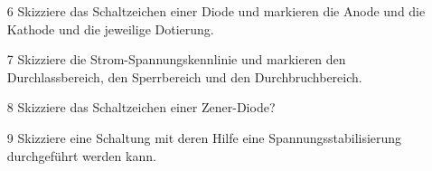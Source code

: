 \begin{enumerate}
\itemsep1pt\parskip0pt
\item[6] Skizziere das Schaltzeichen einer Diode und markieren die Anode und die Kathode und die jeweilige Dotierung.
    \loesung{
    \begin{figure}[H]
    \centering 
    
    \end{figure}
    }
\item[7] Skizziere die Strom-Spannungskennlinie und markieren den Durchlassbereich, den Sperrbereich und den Durchbruchbereich.
\item[8] Skizziere das Schaltzeichen einer Zener-Diode?
	\loesung{
	\begin{figure}[H]
    \centering
	
	\end{figure}
	}
\item[9] Skizziere eine Schaltung mit deren Hilfe eine Spannungsstabilisierung durchgeführt werden kann.
	\loesung{
	\begin{figure}[H]
    \centering 
	\end{figure}
	}
\end{enumerate}
